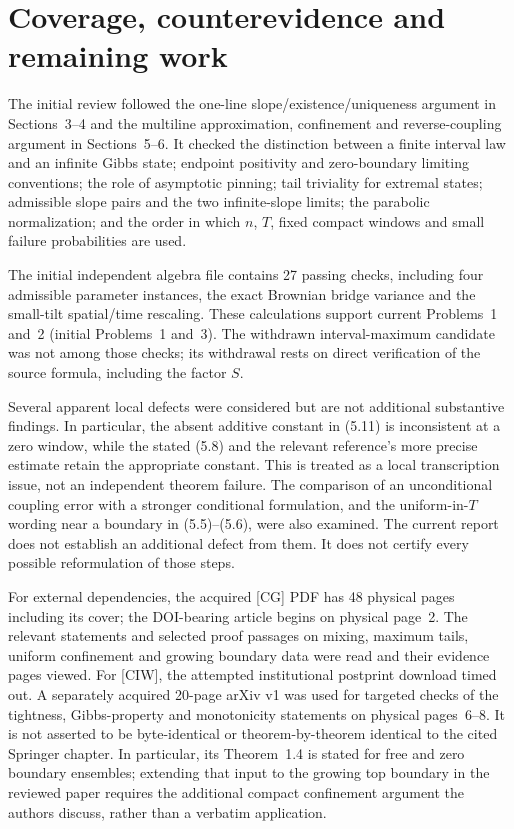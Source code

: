 \documentclass[10pt]{article}
\begin{document}
\section*{Coverage, counterevidence and remaining work}
The initial review followed the one-line slope/existence/uniqueness argument in Sections 3–4 and the multiline approximation, confinement and reverse-coupling argument in Sections 5–6. It checked the distinction between a finite interval law and an infinite Gibbs state; endpoint positivity and zero-boundary limiting conventions; the role of asymptotic pinning; tail triviality for extremal states; admissible slope pairs and the two infinite-slope limits; the parabolic normalization; and the order in which \(n\), \(T\), fixed compact windows and small failure probabilities are used.\par
The initial independent algebra file contains 27 passing checks, including four admissible parameter instances, the exact Brownian bridge variance and the small-tilt spatial/time rescaling. These calculations support current Problems 1 and 2 (initial Problems 1 and 3). The withdrawn interval-maximum candidate was not among those checks; its withdrawal rests on direct verification of the source formula, including the factor \(S\).\par
Several apparent local defects were considered but are not additional substantive findings. In particular, the absent additive constant in (5.11) is inconsistent at a zero window, while the stated (5.8) and the relevant reference’s more precise estimate retain the appropriate constant. This is treated as a local transcription issue, not an independent theorem failure. The comparison of an unconditional coupling error with a stronger conditional formulation, and the uniform-in-\(T\) wording near a boundary in (5.5)–(5.6), were also examined. The current report does not establish an additional defect from them. It does not certify every possible reformulation of those steps.\par
For external dependencies, the acquired [CG] PDF has 48 physical pages including its cover; the DOI-bearing article begins on physical page 2. The relevant statements and selected proof passages on mixing, maximum tails, uniform confinement and growing boundary data were read and their evidence pages viewed. For [CIW], the attempted institutional postprint download timed out. A separately acquired 20-page arXiv v1 was used for targeted checks of the tightness, Gibbs-property and monotonicity statements on physical pages 6–8. It is not asserted to be byte-identical or theorem-by-theorem identical to the cited Springer chapter. In particular, its Theorem 1.4 is stated for free and zero boundary ensembles; extending that input to the growing top boundary in the reviewed paper requires the additional compact confinement argument the authors discuss, rather than a verbatim application.\par
\end{document}
